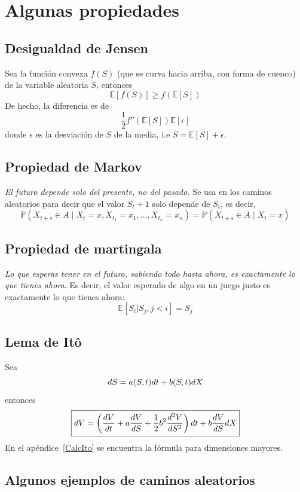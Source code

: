 
\section{Algunas propiedades}

\subsection{Desigualdad de Jensen}
Sea la función convexa $f(S)$ (que se curva hacia arriba, con forma de cuenco) de la variable aleatoria $S$, entonces
\[\mathbb{E}[f(S)] \geq f(\mathbb{E}[S])\]
De hecho, la diferencia es de
\[\frac{1}{2}f''(\mathbb{E}[S])\mathbb{E}[\epsilon]\]
donde $\epsilon$ es la desviación de $S$ de la media, i.e $S=\mathbb{E}[S]+\epsilon$.


\subsection{Propiedad de Markov}
\textit{El futuro depende solo del presente, no del pasado.} Se usa en los caminos aleatorios para decir que el valor $S_t+1$ solo depende de $S_t$, es decir,
\[\mathbb{P}(X_{t+s} \in A \mid X_t = x, X_{t_1} = x_1, \ldots, X_{t_n} = x_n) 
= \mathbb{P}(X_{t+s} \in A \mid X_t = x)\]



\subsection{Propiedad de martingala}
\textit{Lo que esperas tener en el futuro, sabiendo todo hasta ahora, es exactamente lo que tienes ahora}. Es decir, el valor esperado de algo en un juego justo es exactamente lo que tienes ahora:
\[\mathbb{E}[S_i|S_j, j<i]=S_j\]



\subsection{Lema de Itô}
Sea
\[dS = a(S,t)dt + b(S,t)d\mathnormal{X}\]
entonces
\begin{equation}
    \boxed{dV = \left( \frac{dV}{dt} +  a\frac{dV}{dS} + \frac{1}{2}b^2\frac{d^2V}{dS^2} \right)dt + b\frac{dV}{dS}d\mathnormal{X}}
\end{equation}\label{Ito}
En el apéndice~\ref{CalcIto} se encuentra la fórmula para dimensiones mayores.

\subsection{Algunos ejemplos de caminos aleatorios}

